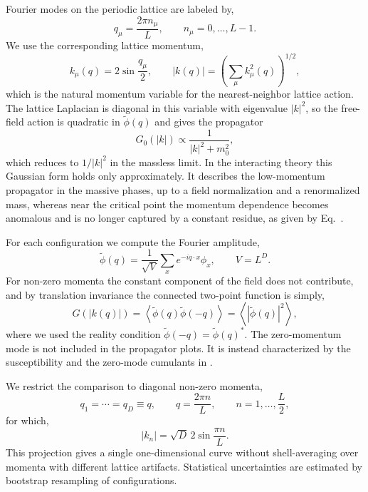 \documentclass[reprint,twocolumn,superscriptaddress,preprintnumbers,amsmath,amssymb,aps,prd,floatfix]{revtex4-2}
\def\Eq#1{Eq.~\labelcref{#1}} \def\Eqs#1{Eqs.~\labelcref{#1}}
\begin{document}
Fourier modes on the periodic lattice are labeled by,
\begin{equation}
  q_\mu = \frac{2\pi n_\mu}{L},
  \qquad
  n_\mu = 0,\ldots,L-1 .
\end{equation}
We use the corresponding lattice momentum,
\begin{equation}
  k_\mu(q)
  =
  2\sin\frac{q_\mu}{2},
  \qquad
  |k(q)|
  =
  \left(
  \sum_\mu k_\mu^2(q)
  \right)^{1/2},
  \label{eq:lattice_momentum}
\end{equation}
which is the natural momentum variable for the nearest-neighbor lattice action. The lattice Laplacian is diagonal in this variable with eigenvalue $|k|^2$, so the free-field action is quadratic in $\tilde\phi(q)$ and gives the propagator
\begin{equation}
  G_0(|k|)
  \propto
  \frac{1}{|k|^2+m_0^2},
  \label{eq:free_lattice_prop}
\end{equation}
which reduces to $1/|k|^2$ in the massless limit. In the interacting theory this Gaussian form holds only approximately. It describes the low-momentum propagator in the massive phases, up to a field normalization and a renormalized mass, whereas near the critical point the momentum dependence becomes anomalous and is no longer captured by a constant residue, as given by \Eq{eq:critical_scaling_prop}.

For each configuration we compute the Fourier amplitude,
\begin{equation}
  \tilde\phi(q)
  =
  \frac{1}{\sqrt{V}}
  \sum_x e^{-iq\cdot x}\phi_x,
  \qquad
  V=L^D .
  \label{eq:fourier_field}
\end{equation}
For non-zero momenta the constant component of the field does not contribute, and by translation invariance the connected two-point function is simply,
\begin{equation}
  G(|k(q)|)
  =
  \left\langle
  \tilde\phi(q)\tilde\phi(-q)
  \right\rangle
  =
  \left\langle
  |\tilde\phi(q)|^2
  \right\rangle ,
  \label{eq:prop_estimator}
\end{equation}
where we used the reality condition $\tilde\phi(-q)=\tilde\phi(q)^*$. The zero-momentum mode is not included in the propagator plots. It is instead characterized by the susceptibility and the zero-mode cumulants in .

We restrict the comparison to diagonal non-zero momenta,
\begin{equation}
  q_1=\cdots=q_D\equiv q,
  \qquad
  q=\frac{2\pi n}{L},
  \qquad
  n=1,\ldots,\frac{L}{2},
  \label{eq:diagonal_momenta}
\end{equation}
for which,
\begin{equation}
  |k_n|
  =
  \sqrt{D}\,2\sin\frac{\pi n}{L}.
  \label{eq:diagonal_lattice_momentum}
\end{equation}
This projection gives a single one-dimensional curve without shell-averaging over momenta with different lattice artifacts. Statistical uncertainties are estimated by bootstrap resampling of configurations.
\end{document}
